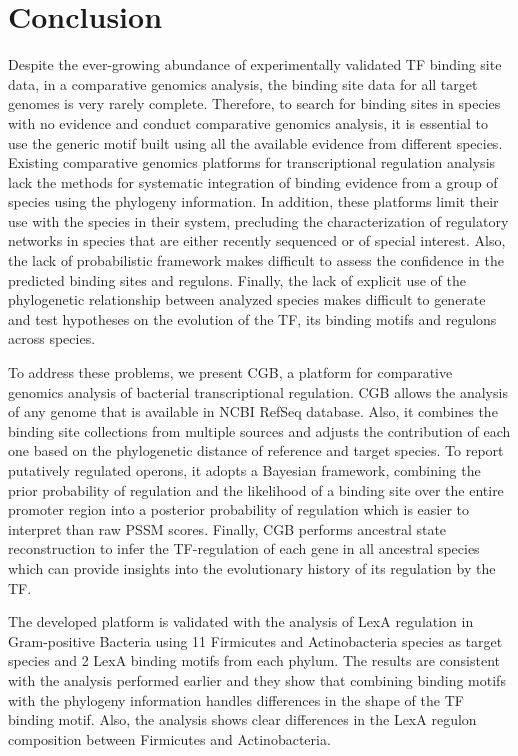 \documentclass[12pt]{article}
\begin{document}
\section{Conclusion}

Despite the ever-growing abundance of experimentally validated TF binding site
data, in a comparative genomics analysis, the binding site data for all target
genomes is very rarely complete. Therefore, to search for binding sites in
species with no evidence and conduct comparative genomics analysis, it is
essential to use the generic motif built using all the available evidence from
different species. Existing comparative genomics platforms for transcriptional
regulation analysis lack the methods for systematic integration of binding
evidence from a group of species using the phylogeny information. In addition,
these platforms limit their use with the species in their system, precluding
the characterization of regulatory networks in species that are either recently
sequenced or of special interest. Also, the lack of probabilistic framework
makes difficult to assess the confidence in the predicted binding sites and
regulons. Finally, the lack of explicit use of the phylogenetic relationship
between analyzed species makes difficult to generate and test hypotheses on the
evolution of the TF, its binding motifs and regulons across species.

To address these problems, we present CGB, a platform for comparative genomics
analysis of bacterial transcriptional regulation. CGB allows the analysis of
any genome that is available in NCBI RefSeq database. Also, it combines the
binding site collections from multiple sources and adjusts the contribution of
each one based on the phylogenetic distance of reference and target species. To
report putatively regulated operons, it adopts a Bayesian framework, combining
the prior probability of regulation and the likelihood of a binding site over
the entire promoter region into a posterior probability of regulation which is
easier to interpret than raw PSSM scores. Finally, CGB performs ancestral state
reconstruction to infer the TF-regulation of each gene in all ancestral species
which can provide insights into the evolutionary history of its regulation by the
TF\@.

The developed platform is validated with the analysis of LexA regulation in
Gram-positive Bacteria using 11 Firmicutes and Actinobacteria species as target
species and 2 LexA binding motifs from each phylum. The results are consistent
with the analysis performed earlier and they show that combining binding motifs
with the phylogeny information handles differences in the shape of the TF
binding motif. Also, the analysis shows clear differences in the LexA regulon
composition between Firmicutes and Actinobacteria.


\clearpage
\singlespacing


\end{document}
